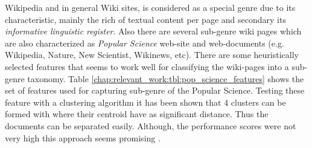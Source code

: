 Wikipedia and in general Wiki sites, is considered as a special genre due to its characteristic, mainly the rich of textual content per page and secondary its \textit{informative linguistic register}. Also there are several sub-genre wiki pages which are also characterized as \textit{Popular Science} web-site and web-documents (e.g. Wikipedia, Nature, New Scientist, Wikinews, etc). There are some heuristically selected features that seems to work well for classifying the wiki-pages into a sub-genre taxonomy. Table \ref{chap:relevant_work:tbl:pop_science_features} shows the set of features used for capturing sub-genre of the Popular Science. Testing these feature with a clustering algorithm it has been shown that 4 clusters can be formed with where their centroid have as significant distance. Thus the documents can be separated easily. Although, the performance scores were not very high this approach seems promising \parencite{lieungnapar2017genre}. 

